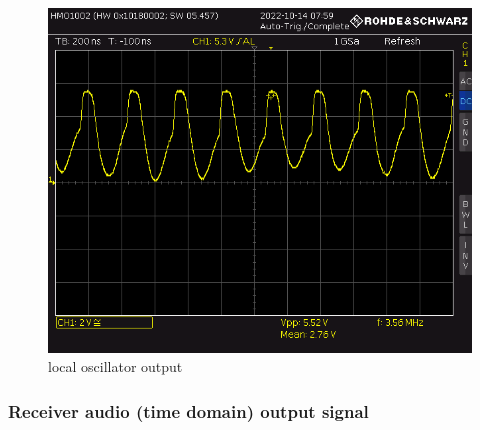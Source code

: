 \documentclass[
11pt, %
a4paper, %
oneside, %
headinclude,footinclude, %
BCOR5mm, %
]{scrartcl}
\begin{document}
\begin{figure}[h!]
    \includegraphics[width=\linewidth]{Figures/BUCK06.PNG}
    \caption{local oscillator output}
    \label{fig:local oscillator output}
\end{figure}


\newpage
\subsubsection{Receiver audio (time domain) output signal}
\end{document}
